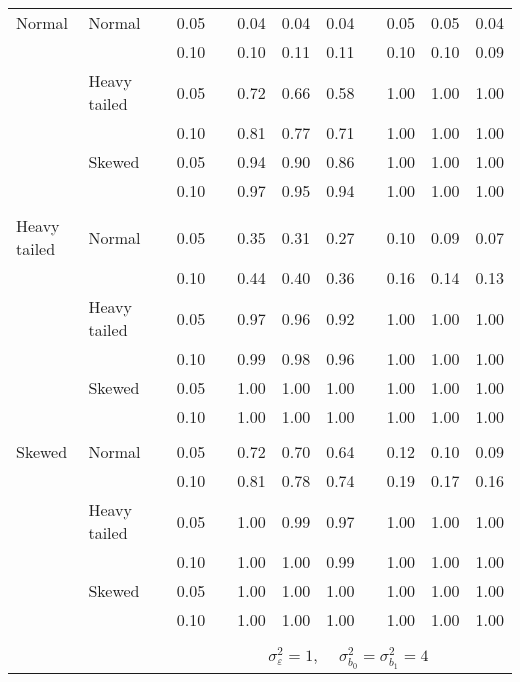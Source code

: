 \begin{table}[ht]
\begin{scriptsize}
\begin{tabular}{ll p{.1cm} c p{.1cm} rrr p{.1cm} rrr}
\rowcolor{gray!20}Normal       & Normal       && 0.05 &&   0.04 & 0.04 & 0.04 && 0.05 & 0.05 & 0.04 \\ 
\rowcolor{gray!20}             &              && 0.10 &&   0.10 & 0.11 & 0.11 && 0.10 & 0.10 & 0.09 \\ 
\rowcolor{gray!20}             & Heavy tailed && 0.05 &&   0.72 & 0.66 & 0.58 && 1.00 & 1.00 & 1.00 \\ 
\rowcolor{gray!20}             &              && 0.10 &&   0.81 & 0.77 & 0.71 && 1.00 & 1.00 & 1.00 \\ 
\rowcolor{gray!20}             & Skewed       && 0.05 &&   0.94 & 0.90 & 0.86 && 1.00 & 1.00 & 1.00 \\ 
\rowcolor{gray!20}             &              && 0.10 &&   0.97 & 0.95 & 0.94 && 1.00 & 1.00 & 1.00 \\ 
             &&&&&&&&&&&\\
Heavy tailed & Normal       && 0.05 &&   0.35 & 0.31 & 0.27 && 0.10 & 0.09 & 0.07 \\ 
             &              && 0.10 &&   0.44 & 0.40 & 0.36 && 0.16 & 0.14 & 0.13 \\ 
             & Heavy tailed && 0.05 &&   0.97 & 0.96 & 0.92 && 1.00 & 1.00 & 1.00 \\ 
             &              && 0.10 &&   0.99 & 0.98 & 0.96 && 1.00 & 1.00 & 1.00 \\ 
             & Skewed       && 0.05 &&   1.00 & 1.00 & 1.00 && 1.00 & 1.00 & 1.00 \\ 
             &              && 0.10 &&   1.00 & 1.00 & 1.00 && 1.00 & 1.00 & 1.00 \\
             &&&&&&&&&&&\\ 
Skewed       & Normal       && 0.05 &&   0.72 & 0.70 & 0.64 && 0.12 & 0.10 & 0.09 \\ 
             &              && 0.10 &&   0.81 & 0.78 & 0.74 && 0.19 & 0.17 & 0.16 \\ 
             & Heavy tailed && 0.05 &&   1.00 & 0.99 & 0.97 && 1.00 & 1.00 & 1.00 \\ 
             &              && 0.10 &&   1.00 & 1.00 & 0.99 && 1.00 & 1.00 & 1.00 \\ 
             & Skewed       && 0.05 &&   1.00 & 1.00 & 1.00 && 1.00 & 1.00 & 1.00 \\ 
             &              && 0.10 &&   1.00 & 1.00 & 1.00 && 1.00 & 1.00 & 1.00 \\ 



&&&&&&&&&&&\\
& && && \multicolumn{6}{c}{$\sigma_{\varepsilon}^2 = 1$, \ \ $\sigma_{b_0}^2 = \sigma_{b_1}^2 = 4$} \\ \cline{6-12}


\end{tabular}
\end{scriptsize}
\end{table}

